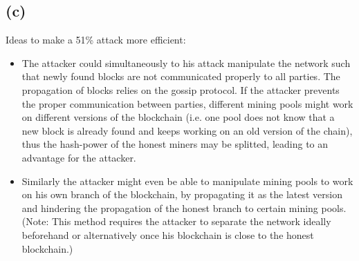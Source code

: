 \documentclass[12pt,pdftex,a4paper]{article}
\begin{document}
\subsection*{(c)}
Ideas to make a 51\% attack more efficient:
\begin{itemize}
\item The attacker could simultaneously to his attack manipulate the network such that newly found blocks are not communicated properly to all parties. The propagation of blocks relies on the gossip protocol. If the attacker prevents the proper communication between parties, different mining pools might work on different versions of the blockchain (i.e. one pool does not know that a new block is already found and keeps working on an old version of the chain), thus the hash-power of the honest miners may be splitted, leading to an advantage for the attacker.
\item Similarly the attacker might even be able to manipulate mining pools to work on his own branch of the blockchain, by propagating it as the latest version and hindering the propagation of the honest branch to certain mining pools. (Note: This method requires the attacker to separate the network ideally beforehand or alternatively once his blockchain is close to the honest blockchain.)
\end{itemize}
\end{document}
